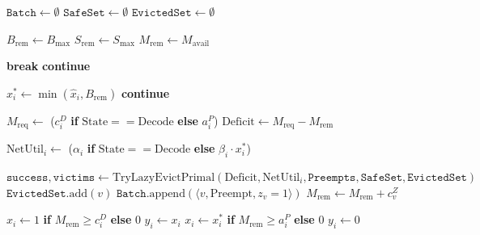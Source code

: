 \documentclass[11pt]{article}
\begin{document}
\begin{algorithm}[htpb]
\caption{Primal Phase 2: Lazy Packing \& Fluid Extraction}
\label{alg:primal_phase2}
\begin{algorithmic}[1]
    \State $\texttt{Batch} \gets \emptyset$
    \State $\texttt{SafeSet} \gets \emptyset$ 
    \State $\texttt{EvictedSet} \gets \emptyset$
    
    \State $B_{\text{rem}} \gets B_{\max}$
    \State $S_{\text{rem}} \gets S_{\max}$
    \State $M_{\text{rem}} \gets M_{\mathrm{avail}}$
    
         \textbf{break} \EndIf {}
         \textbf{continue} \EndIf
        
        \State {}
        \State $x_i^* \gets \min(\hat{x}_i, B_{\text{rem}})$
         \textbf{continue} \EndIf
        
        \State {}
        \State \(M_{\text{req}} \gets\) (\(c_i^D\) \textbf{if} \(\text{State} == \text{Decode}\) \textbf{else} \(a_i^P\))
        \State $\text{Deficit} \gets M_{\text{req}} - M_{\text{rem}}$
        
            \State $\text{NetUtil}_i \gets$ ($\alpha_i$ \textbf{if} $\text{State} == \text{Decode}$ \textbf{else} $\beta_i \cdot x_i^*$)
            
            \State $\texttt{success}, \texttt{victims} \gets \text{TryLazyEvictPrimal}(\text{Deficit}, \text{NetUtil}_i, \texttt{Preempts}, \texttt{SafeSet}, \texttt{EvictedSet})$ 
                    \State $\texttt{EvictedSet}.\text{add}(v)$
                    \State $\texttt{Batch}.\text{append}(\langle v, \text{Preempt}, z_v=1 \rangle)$
                    \State $M_{\text{rem}} \gets M_{\text{rem}} + c_v^Z$ 
                \EndFor
            \EndIf
        \EndIf
        
        \State {}
            \State $x_i \gets 1$ \textbf{if} $M_{\text{rem}} \ge c_i^D$ \textbf{else} $0$
            \State $y_i \gets x_i$
        \Else
            \State \(x_i \gets x_i^*\) \textbf{if} \(M_{\text{rem}} \ge a_i^P\) \textbf{else} \(0\) 
            \State $y_i \gets 0$
        \EndIf
        

\end{algorithmic}
\end{algorithm}
\end{document}
